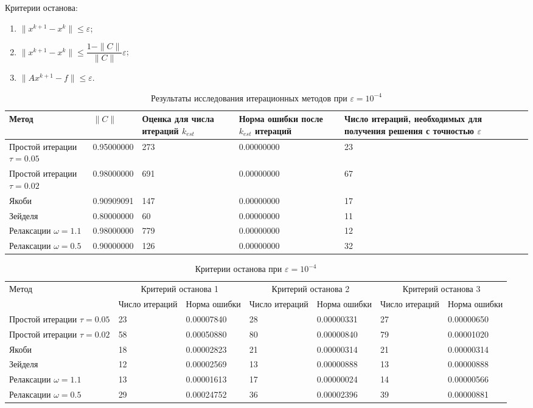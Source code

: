 \documentclass[12pt, a4paper]{article}
\begin{document}
	Критерии останова:
	\begin{enumerate}
			\item $\|x^{k+1} - x^k\| \le \varepsilon$;
		\medskip
		\item $\|x^{k+1} - x^k\| \le \dfrac{1-\|C\|}{\|C\|} \varepsilon$;
		\medskip
			\item $\|A x^{k+1} - f\| \le \varepsilon.$
	\end{enumerate}
	\begin{table}[h]
	\caption{Результаты исследования итерационных методов при $\varepsilon=10^{-4}$}
	\footnotesize
	\begin{tabular}{|p{4.3cm}|p{2.4cm}|p{1.9cm}|p{3cm}|p{3.15cm}|}
		\hline
		Метод & $\|C\|$& Оценка для  числа итераций $k_{est}$& Норма ошибки после $k_{est}$ итераций & Число итераций, необходимых для получения решения с точностью $\varepsilon$  \\
		\hline
		Простой итерации $\tau=0.05$ &0.95000000&273&0.00000000&23\\
		\hline
		Простой итерации $\tau= 0.02$ & 0.98000000&691&0.00000000&67\\
		\hline
		Якоби &0.90909091&147&0.00000000&17\\
		\hline
		Зейделя &0.80000000&60&0.00000000&11\\
		\hline
		Релаксации $\omega=1.1$ &0.98000000&779&0.00000000&12\\
		\hline
		Релаксации $\omega=0.5$ &0.90000000&126&0.00000000&32\\
		\hline
	\end{tabular}
\end{table}

	\begin{table}[h]
	\caption{Критерии останова при $\varepsilon=10^{-4}$}
	\footnotesize
	\begin{tabular}{|p{4.3 cm}|p{1.49cm}|p{1.7cm}|p{1.49cm}|p{1.7cm}|p{1.49cm}|p{1.7cm}|}
		\hline
		 	\multirow{2}{4em}{Метод} &\multicolumn{2}{c|}{Критерий останова 1} & \multicolumn{2}{c|}{Критерий останова 2} & \multicolumn{2}{c|}{Критерий останова 3} \\
\cline{2-7}
	&Число итераций&Норма ошибки&Число итераций&Норма ошибки&Число итераций&Норма ошибки\\
		\hline
		Простой итерации $\tau=0.05$ &23&0.00007840&28&0.00000331&27&0.00000650\\
		\hline
		Простой итерации $\tau= 0.02$ &58&0.00050880&80& 0.00000840&79&0.00001020\\
		\hline
		Якоби &18&0.00002823&21&0.00000314&21&0.00000314\\
		\hline
		Зейделя &12&0.00002569&13& 0.00000888&13&0.00000888\\
		\hline
		Релаксации $\omega=1.1$ &13&0.00001613&17&0.00000024&14& 0.00000566\\
		\hline
		Релаксации $\omega=0.5$ &29&0.00024752&36&0.00002396&39&0.00000881\\
		\hline
	\end{tabular}
\end{table}
\newpage
	
\end{document}
